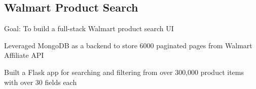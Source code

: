 \documentclass[11pt]{article}
\begin{document}
\subsection*{Walmart Product Search \hfill {}}
\noindent
Goal: To build a full-stack Walmart product search UI
\begin{compactitem}
    \item Leveraged MongoDB as a backend to store 6000 paginated pages from Walmart
    Affiliate API
    \item Built a Flask app for searching and filtering from over 300,000
    product items with over 30 fields each
\end{compactitem}


\end{document}
